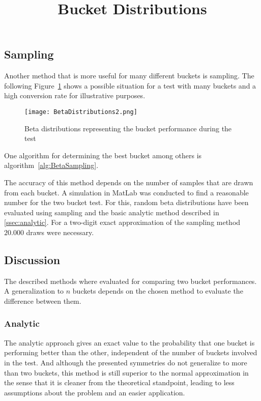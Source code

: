 \documentclass[../Thesis.tex]{subfiles}
\begin{document}
\subsection{Sampling}
Another method that is more useful for many different buckets is sampling. The following Figure~\ref{fig:SampleBucks} shows a possible situation for a test with many buckets and a high conversion rate for illustrative purposes.
\begin{figure}[h]
\centering
\texttt{[image: BetaDistributions2.png]}
\title{Bucket Distributions}
\caption[Bucket Distributions]{Beta distributions representing the bucket performance during the test}
\label{fig:SampleBucks}
\end{figure}
One algorithm for determining the best bucket among others is algorithm~\ref{alg:BetaSampling}.
The accuracy of this method depends on the number of samples that are drawn from each bucket. A simulation in MatLab was conducted to find a reasonable number for the two bucket test. For this, random beta distributions have been evaluated using sampling and the basic analytic method described in \ref{ssec:analytic}. For a two-digit exact approximation of the sampling method $20.000$ draws were necessary.


\subsection{Discussion}
The described methods where evaluated for comparing two bucket performances. A generalization to $n$ buckets depends on the chosen method to evaluate the difference between them.

\subsubsection{Analytic}
The analytic approach gives an exact value to the probability that one bucket is performing better than the other, independent of the number of buckets involved in the test. And although the presented symmetries do not generalize to more than two buckets, this method is still superior to the normal approximation in the sense that it is cleaner from the theoretical standpoint, leading to less assumptions about the problem and an easier application.
\end{document}
